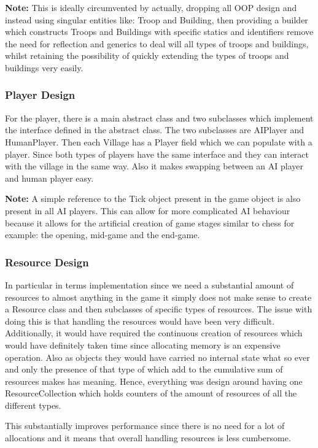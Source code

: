\documentclass[12pt]{article}
\begin{document}
\textbf{Note:} This is ideally circumvented by actually,
dropping all OOP design and instead using singular entities
like: Troop and Building, then providing a builder which
constructs Troops and Buildings with specific statics and
identifiers remove the need for reflection and generics to deal
will all types of troops and buildings, whilst retaining the
possibility of quickly extending the types of troops and
buildings very easily.

\subsubsection{Player Design}

For the player, there is a main abstract class and two
subclasses which implement the interface defined in the abstract
class. The two subclasses are AIPlayer and HumanPlayer. Then
each Village has a Player field which we can populate with a
player. Since both types of players have the same interface and
they can interact with the village in the same way. Also it
makes swapping between an AI player and human player easy.

\textbf{Note:} A simple reference to the Tick object present in
the game object is also present in all AI players. This can
allow for more complicated AI behaviour because it allows for
the artificial creation of game stages similar to chess for
example: the opening, mid-game and the end-game.

\subsubsection{Resource Design}

In particular in terms implementation since  we need a
substantial amount of resources to almost anything in the game
it simply does not make sense to create a Resource class and
then subclasses of specific types of resources. The issue with
doing this is that handling the resources would have been very
difficult. Additionally, it would have required the continuous
creation of resources which would have definitely taken time
since allocating memory is an expensive operation. Also as
objects they would have carried no internal state what so ever
and only the presence of that type of which add to the
cumulative sum of resources makes has meaning. Hence, everything
was design around having one ResourceCollection which holds
counters of the amount of resources of all the different types.

This substantially improves performance since there is no need
for a lot of allocations and it means that overall handling
resources is less cumbersome.
\end{document}
